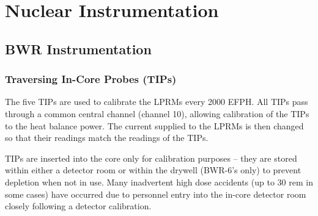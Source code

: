\documentclass[10pt]{article}
\begin{document}
\section{Nuclear Instrumentation}

\subsection{BWR Instrumentation}
\subsubsection{Traversing In-Core Probes (TIPs)}

The five TIPs are used to calibrate the LPRMs every 2000 EFPH. All TIPs pass through a common central channel (channel 10), allowing calibration of the TIPs to the heat balance power. The current supplied to the LPRMs is then changed so that their readings match the readings of the TIPs. 

TIPs are inserted into the core only for calibration purposes – they are stored within either a detector room or within the drywell (BWR-6’s only) to prevent depletion when not in use. Many inadvertent high dose accidents (up to 30 rem in some cases) have occurred due to personnel entry into the in-core detector room closely following a detector calibration. 
\end{document}
